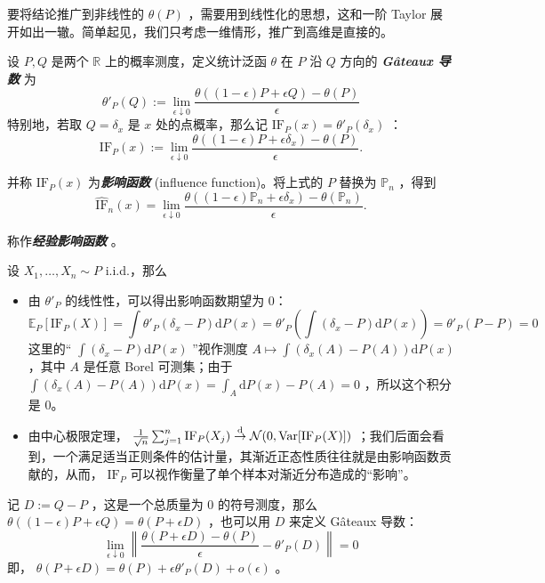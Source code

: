 要将结论推广到非线性的 $\theta(P)$ ，需要用到线性化的思想，这和一阶 Taylor 展开如出一辙。简单起见，我们只考虑一维情形，推广到高维是直接的。

\begin{definition*}
设 $P,Q$ 是两个 $\mathbb R$ 上的概率测度，定义统计泛函 $\theta$ 在 $P$ 沿 $Q$ 方向的 \textbf{\emph{Gâteaux 导数}} 为
\[\theta'_P(Q):=\lim_{\epsilon\downarrow 0}\frac{\theta((1-\epsilon)P+\epsilon Q)-\theta(P)}{\epsilon}\]
特别地，若取 $Q=\delta_x$ 是 $x$ 处的点概率，那么记 $\mathrm{IF}_P(x)=\theta'_P(\delta_x)$ ：
\[
\mathrm{IF}_P(x):=\lim_{\epsilon\downarrow 0}\frac{\theta((1-\epsilon)P+\epsilon \delta_x)-\theta(P)}{\epsilon}.
\]

并称 $\mathrm{IF}_P(x)$ 为\textbf{\emph{影响函数}} (influence function)。将上式的 $P$ 替换为 $\mathbb P_n$ ，得到
\[
\widehat{\mathrm{IF}}_n(x)=\lim_{\epsilon\downarrow 0}\frac{\theta((1-\epsilon)\mathbb P_n+\epsilon \delta_x)-\theta(\mathbb P_n)}{\epsilon}.
\]

称作\textbf{\emph{经验影响函数}} 。
\end{definition*}

\begin{remark}
设 $X_1,\dots,X_n\sim P$ i.i.d.，那么

\begin{itemize}
\tightlist
\item
  由 $\theta'_P$ 的线性性，可以得出影响函数期望为 0： \[ \mathbb E_P[\mathrm{IF}_P(X)]=\int \theta'_P(\delta_x-P)\mathrm{d}P(x)= \theta'_P\left(\int (\delta_x-P)\mathrm{d}P(x)\right)=\theta'_P(P-P)=0 \]这里的`` $\textstyle\int(\delta_x-P)\mathrm dP(x)$ ''视作测度 $A\mapsto \int(\delta_x(A)-P(A))\mathrm dP(x)$ ，其中 $A$ 是任意 Borel 可测集；由于 $\int(\delta_x(A)-P(A))\mathrm dP(x)=\int_A \mathrm{d}P(x)-P(A)=0$ ，所以这个积分是 0。
\item
  由中心极限定理， $\frac1{\sqrt n}\sum_{j=1}^n\mathrm{IF}_P(X_j)\overset{\rm d}\to \mathcal N(0,\mathrm{Var}[\mathrm{IF}_P(X)])$ ；我们后面会看到，一个满足适当正则条件的估计量，其渐近正态性质往往就是由影响函数贡献的，从而， $\mathrm{IF}_P$ 可以视作衡量了单个样本对渐近分布造成的``影响''。
\end{itemize}
\end{remark}

记 $D:=Q-P$ ，这是一个总质量为 0 的符号测度，那么 $\theta((1-\epsilon) P+\epsilon Q)=\theta(P+\epsilon D)$ ，也可以用 $D$ 来定义 Gâteaux 导数：
\[\lim_{\epsilon\downarrow 0}\left\|\frac{\theta(P+\epsilon D)-\theta(P)}{\epsilon}-\theta'_P(D)\right\|=0\]
即， $\theta(P+\epsilon D)=\theta(P)+\epsilon \theta'_P(D)+o(\epsilon)$ 。

